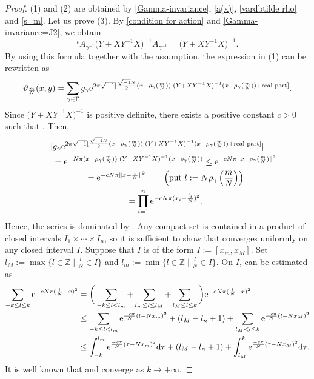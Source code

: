 \documentclass[10pt,a4paper]{amsart}
\numberwithin{equation}{section}
\newcommand{\Z}{\mathbb{Z}}
\newcommand{\norm}[1]{\lVert#1\rVert}
\begin{document}
\begin{proof}
(1) and (2) are obtained by \eqref{Gamma-invariance}, \eqref{a(x)}, \eqref{vardbtilde rho} and \eqref{s_m}.
Let us prove (3). By \eqref{condition for action} and \eqref{Gamma-invariance=J2}, we obtain
\[
{}^tA_{\gamma^{-1}}\bigl(Y+XY^{-1}X\bigr)^{-1}A_{\gamma^{-1}}=\bigl(Y+XY^{-1}X\bigr)^{-1}.
\]
By using this formula together with the assumption, the expression in (1) can be rewritten as
\begin{equation*}
\vartheta_{\frac{m}{N}}(x,y)=\sum_{\gamma \in \Gamma}g_\gamma {\rm e}^{2\pi\sqrt{-1} [\frac{\sqrt{-1}N}{2} (x-\rho_{\gamma} ( \frac{m}{N} ) )\cdot (Y+XY^{-1}X)^{-1} (x-\rho_{\gamma}(\frac{m}{N}) ) +\text{real part} ]}.
\end{equation*}
Since $\bigl(Y+XY^{-1}X\bigr)^{-1}$ is positive definite, there exists a positive constant $c>0$ such that . Then,
\begin{gather*}
 | g_\gamma {\rm e}^{2\pi\sqrt{-1} [\frac{\sqrt{-1}N}{2} (x-\rho_{\gamma} ( \frac{m}{N} ) )\cdot (Y+XY^{-1}X)^{-1} (x-\rho_{\gamma}(\frac{m}{N}) ) +\text{real part} ]} | \\
\qquad={\rm e}^{-N\pi (x-\rho_{\gamma} ( \frac{m}{N} ) )\cdot (Y+XY^{-1}X)^{-1} (x-\rho_{\gamma}(\frac{m}{N}) )}
\le {\rm e}^{-cN\pi \norm{ x-\rho_{\gamma} ( \frac{m}{N} )}^2}\\
\qquad= {\rm e}^{-cN\pi \norm{ x-\frac{l}{N}}^2}
\qquad \left(\text{put } l:=N\rho_{\gamma} \left( \frac{m}{N} \right) \right)\\
\qquad= \prod_{i=1}^n {\rm e}^{-cN\pi (x_i-\frac{l_i}{N} )^2}.
\end{gather*}
Hence, the series is dominated by \smash{$\prod_{i=1}^n\sum_{l_i\in \Z}{\rm e}^{-cN\pi (\frac{l_i}{N}-x_i)^2}$}. Any compact set is contained in a product of closed intervals $I_1\times \cdots \times I_n$, so it is sufficient to show that \smash{$\sum_{l\in \Z}{\rm e}^{-cN\pi (\frac{l}{N}-x)^2}$} converges uniformly on any closed interval $I$.
Suppose that $I$ is of the form $I:=[x_m, x_M]$. Set~${l_M:=\max \big\{ l\in \Z \mid \frac{l}{N}\in I\big\}}$ and $l_m:=\min \big\{ l\in \Z \mid \frac{l}{N}\in I\big\}$. On $I$,  can be estimated as
\begin{align*}
\sum_{-k\le l\le k}{\rm e}^{-cN\pi (\frac{l}{N}-x)^2}&=\bigg(\sum_{-k\le l<l_m}+\sum_{l_m\le l\le l_M}+\sum_{l_M\le l\le k}\bigg){\rm e}^{-cN\pi (\frac{l}{N}-x)^2}\\
&\le \sum_{-k\le l<l_m}{\rm e}^{\frac{-c\pi}{N} (l-Nx_m)^2}+(l_M-l_n+1)+\sum_{l_M< l\le k}{\rm e}^{\frac{-c\pi}{N} (l-Nx_M)^2}\\
&\le \int_{-k}^{l_m}{\rm e}^{\frac{-c\pi}{N}(\tau -Nx_m)^2}{\rm d}\tau +(l_M-l_n+1)+\int_{l_M}^k {\rm e}^{\frac{-c\pi}{N}(\tau -Nx_M)^2}{\rm d}\tau.
\end{align*}
It is well known that  and  converge as ${k\to +\infty}$.
\end{proof}
\end{document}
